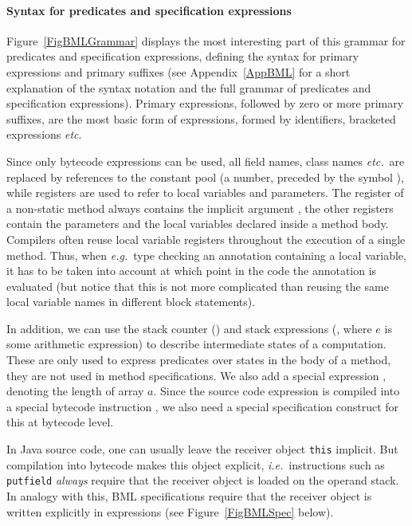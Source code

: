 \paragraph{Syntax for predicates and specification expressions}
Figure~\ref{FigBMLGrammar} displays the most interesting part of this
grammar for predicates and specification expressions, defining the
syntax for primary expressions and primary suffixes (see
Appendix~\ref{AppBML} for a short explanation of the syntax notation
and the full grammar of predicates and specification
expressions). Primary expressions, followed by zero or more primary
suffixes, are the most basic form of expressions, formed by
identifiers, bracketed expressions \emph{etc}.

Since only bytecode expressions can be used, all field names, class
names \emph{etc.}\ are replaced by references to the constant pool (a
number, preceded by the symbol \codeHook{\#}), while registers are
used to refer to local variables and parameters. The register
 of a non-static method always contains the implicit
argument , the other registers contain the parameters
and the local variables declared inside a method body. Compilers often
reuse local variable registers throughout the execution of a single
method. Thus, when \emph{e.g.}\ type checking an annotation containing
a local variable, it has to be taken into account at which point in
the code the annotation is evaluated (but notice that this is not more
complicated than reusing the same local variable names in different
block statements).

In addition, we can use the stack counter () and stack
expressions (, where \(e\) is some arithmetic
expression) to describe intermediate states of a computation.  These
are only used to express predicates over states in the body of a
method, they are not used in method specifications. We also add a
special expression , denoting the length of
array \(a\). Since the source code expression
 is compiled into a special bytecode
instruction , we also need a special
specification construct for this at bytecode level.

In Java source code, one can usually leave the receiver object
\texttt{this} implicit. But compilation into bytecode makes this
object explicit, \emph{i.e.}\ instructions such as \texttt{putfield}
\emph{always} require that the receiver object is loaded on the
operand stack. In analogy with this, BML specifications require that
the receiver object is written explicitly in expressions (see
Figure~\ref{FigBMLSpec} below). 


